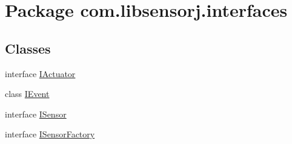 \hypertarget{namespacecom_1_1libsensorj_1_1interfaces}{}\section{Package com.\+libsensorj.\+interfaces}
\label{namespacecom_1_1libsensorj_1_1interfaces}
\subsection*{Classes}
\begin{DoxyCompactItemize}
\item 
interface \hyperlink{interfacecom_1_1libsensorj_1_1interfaces_1_1IActuator}{I\+Actuator}
\item 
class \hyperlink{classcom_1_1libsensorj_1_1interfaces_1_1IEvent}{I\+Event}
\item 
interface \hyperlink{interfacecom_1_1libsensorj_1_1interfaces_1_1ISensor}{I\+Sensor}
\item 
interface \hyperlink{interfacecom_1_1libsensorj_1_1interfaces_1_1ISensorFactory}{I\+Sensor\+Factory}
\end{DoxyCompactItemize}
